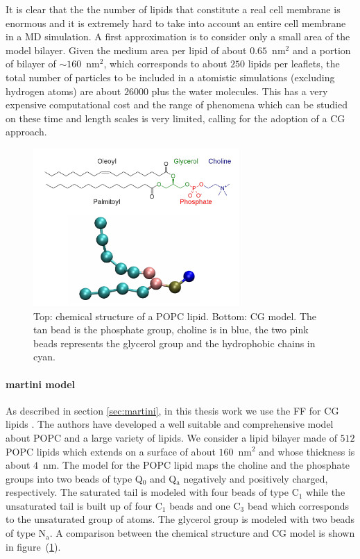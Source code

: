 It is clear that the the number of lipids that constitute a real cell membrane is enormous and it is extremely hard to take into account an entire cell membrane in a \ac{MD} simulation. A first approximation is to consider only a small area of the model bilayer. Given the medium area per lipid of about $0.65$~nm$^2$ and a portion of bilayer of $\sim 160$~nm$^2$, which corresponds to about $250$ lipids per leaflets, the total number of particles to be included in a atomistic simulations (excluding hydrogen atoms) are about $26000$ plus the water molecules. This has a very expensive computational cost and the range of phenomena which can be studied on these time and length scales is very limited, calling for the adoption of a \ac{CG} approach.

\begin{figure}[!ht]
	\centering
	\includegraphics[width=0.7\textwidth]{./img/POPC/popc}
	\caption{Top: chemical structure of a \acs{POPC} lipid. Bottom: \martini \acs{CG} model. The tan bead is the phosphate group, choline is in blue, the two pink beads represents the glycerol group and the hydrophobic chains in cyan.}
	\label{fig:popc}
\end{figure}

\paragraph{\textbf{martini model}} As described in section \ref{sec:martini}, in this thesis work we use the \martini \ac{FF} for \ac{CG} lipids \cite{Martini}. The authors have developed a well suitable and comprehensive model about \ac{POPC} and a large variety of lipids. We consider a lipid bilayer made of $512$ \ac{POPC} lipids which extends on a surface of about $160$~nm$^2$ and whose thickness is about $4$~nm. The \martini model for the \ac{POPC} lipid maps the choline and the phosphate groups into two beads of type Q$_0$ and Q$_\text{a}$ negatively and positively charged, respectively. The saturated tail is modeled with four beads of type C$_1$ while the unsaturated tail is built up of four C$_1$ beads and one C$_3$ bead which corresponds to the unsaturated group of atoms. The glycerol group is modeled with two beads of type N$_\text{a}$. A comparison between the chemical structure and \ac{CG} model is shown in figure~(\ref{fig:popc}).

